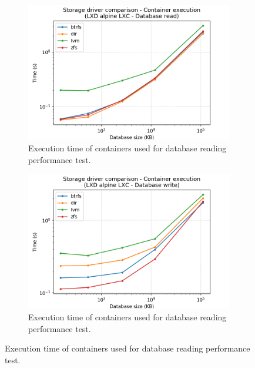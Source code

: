 \begin{figure}[h!]
    \begin{subfigure}{.5\textwidth}
      \centering
      \includegraphics[width=\linewidth]{images/storage-driver/storage-driver-execution-LXD-alpine-LXC---Database-read.png}
      \caption{Execution time of containers used for database reading performance test.}
      \label{fig:storage-driver:lxc:db-read-exec}
    \end{subfigure}
    \begin{subfigure}{.5\textwidth}
      \centering
      \includegraphics[width=\linewidth]{images/storage-driver/storage-driver-execution-LXD-alpine-LXC---Database-write.png}
      \caption{Execution time of containers used for database reading performance test.}
      \label{fig:storage-driver:lxc:db-write-exec}
    \end{subfigure}
    

\end{figure}
